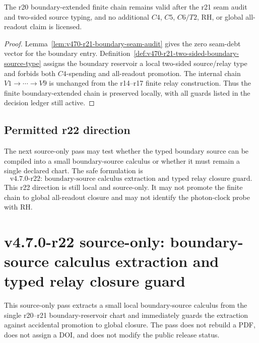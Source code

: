 \begin{proposition}
\label{prop:v470-r21-typed-local-chain-preservation}
The r20 boundary-extended finite chain remains valid after the r21 seam audit
and two-sided source typing, and no additional \(C4\), \(C5\), \(C6/T2\), RH, or
global all-readout claim is licensed.
\end{proposition}

\begin{proof}
Lemma~\ref{lem:v470-r21-boundary-seam-audit} gives the zero seam-debt vector for
the boundary entry.  Definition~\ref{def:v470-r21-two-sided-boundary-source-type}
assigns the boundary reservoir a local two-sided source/relay type and forbids
both \(C4\)-spending and all-readout promotion.  The internal chain
\(V1\to\cdots\to V9\) is unchanged from the r14--r17 finite relay construction.
Thus the finite boundary-extended chain is preserved locally, with all guards
listed in the decision ledger still active.
\end{proof}

\subsection{Permitted r22 direction}
\label{subsec:v470-r21-permitted-r22-direction}

The next source-only pass may test whether the typed boundary source can be
compiled into a small boundary-source calculus or whether it must remain a
single declared chart.  The safe formulation is
\[
\boxed{
\text{v4.7.0-r22: boundary-source calculus extraction and typed relay closure guard.}
}
\]
This r22 direction is still local and source-only.  It may not promote the
finite chain to global all-readout closure and may not identify the photon-clock
probe with RH.



\section{v4.7.0-r22 source-only: boundary-source calculus extraction and typed relay closure guard}
\label{sec:v470-r22-boundary-source-calculus-guard}

This source-only pass extracts a small local boundary-source calculus from the
single r20--r21 boundary-reservoir chart and immediately guards the extraction
against accidental promotion to global closure.  The pass does not rebuild a PDF,
does not assign a DOI, and does not modify the public release status.

